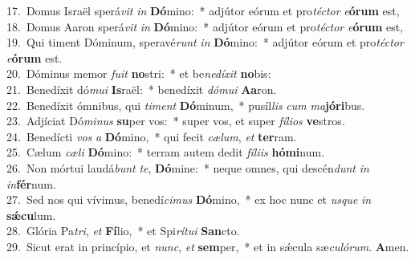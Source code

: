 {17.~}Domus Israël sperá\textit{vit} \textit{in} \textbf{Dó}mino:~* adjútor eórum et pro\textit{té}\textit{ctor} \textit{e}\textbf{ó}\textbf{rum} est,\\
{18.~}Domus Aaron sperá\textit{vit} \textit{in} \textbf{Dó}mino:~* adjútor eórum et pro\textit{té}\textit{ctor} \textit{e}\textbf{ó}\textbf{rum} est,\\
{19.~}Qui timent Dóminum, speravé\textit{runt} \textit{in} \textbf{Dó}mino:~* adjútor eórum et pro\textit{té}\textit{ctor} \textit{e}\textbf{ó}\textbf{rum} est.\\
{20.~}Dóminus memor \textit{fu}\textit{it} \textbf{no}stri:~* et be\textit{ne}\textit{dí}\textit{xit} \textbf{no}bis:\\
{21.~}Benedíxit dó\textit{mu}\textit{i} \textbf{Is}raël:~* benedíxit \textit{dó}\textit{mu}\textit{i} \textbf{A}\textbf{a}ron.\\
{22.~}Benedíxit ómnibus, qui \textit{ti}\textit{ment} \textbf{Dó}minum,~* pusíl\textit{lis} \textit{cum} \textit{ma}\textbf{jó}\textbf{ri}bus.\\
{23.~}Adjíciat Dó\textit{mi}\textit{nus} \textbf{su}per vos:~* super vos, et super \textit{fí}\textit{li}\textit{os} \textbf{ve}stros.\\
{24.~}Benedícti \textit{vos} \textit{a} \textbf{Dó}mino,~* qui fecit \textit{cæ}\textit{lum}, \textit{et} \textbf{ter}ram.\\
{25.~}Cælum \textit{cæ}\textit{li} \textbf{Dó}mino:~* terram autem dedit \textit{fí}\textit{li}\textit{is} \textbf{hó}\textbf{mi}num.\\
{26.~}Non mórtui laudá\textit{bunt} \textit{te}, \textbf{Dó}mine:~* neque omnes, qui descén\textit{dunt} \textit{in} \textit{in}\textbf{fér}num.\\
{27.~}Sed nos qui vívimus, benedí\textit{ci}\textit{mus} \textbf{Dó}mino,~* ex hoc nunc et \textit{us}\textit{que} \textit{in} \textbf{sǽ}\textbf{cu}lum.\\
{28.~}Glória Pa\textit{tri}, \textit{et} \textbf{Fí}lio,~* et Spi\textit{rí}\textit{tu}\textit{i} \textbf{San}cto.\\
{29.~}Sicut erat in princípio, et \textit{nunc}, \textit{et} \textbf{sem}per,~* et in sǽcula sæ\textit{cu}\textit{ló}\textit{rum}. \textbf{A}men.\\
